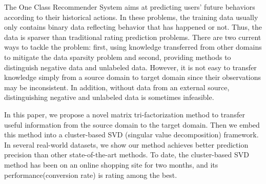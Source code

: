 The One Class Recommender System aims at predicting users’ future behaviors according to their historical actions. In these problems, the training data usually only contains binary data reflecting behavior that has happened or not. Thus, the data is sparser than traditional rating prediction problems. There are two current ways to tackle the problem: first, using knowledge transferred from other domains to mitigate the data sparsity problem and second, providing methods to distinguish negative data and unlabeled data. However, it is not easy to transfer knowledge simply from a source domain to target domain since their observations may be inconsistent. In addition, without data from an external source, distinguishing negative and unlabeled data is sometimes infeasible.

In this paper, we propose a novel matrix tri-factorization method to transfer useful information from the source domain to the target domain. Then we embed this method into a cluster-based SVD (singular value decomposition) framework. In several real-world datasets, we show our method achieves better prediction precision than other state-of-the-art methods. To date, the cluster-based SVD method has been on an online shopping site for two months, and its performance(conversion rate) is rating among the best.
